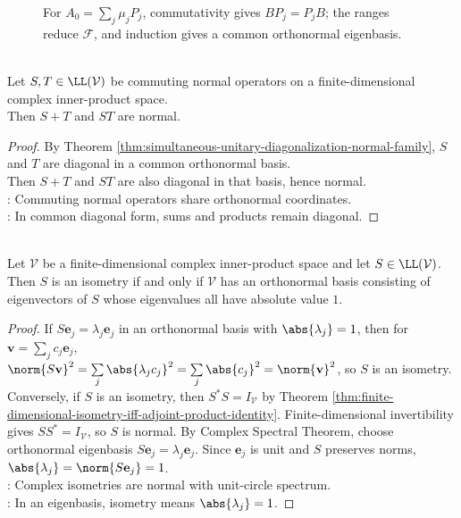 \begin{figure}[H]
  \centering
  
  \caption{For $A_0=\sum_j\mu_jP_j$, commutativity gives $BP_j=P_jB$; the ranges reduce $\mathcal{F}$, and induction gives a common orthonormal eigenbasis.}
  \label{fig:simultaneous-normal-diagonalization}
\end{figure}

\begin{corollary} \label{cor:commuting-normal-sums-products-normal} \\
Let $S,T\in\LL(\mathcal{V})$ be commuting normal operators on a finite-dimensional complex inner-product space.\\
Then $S+T$ and $ST$ are normal.
\begin{proof}
By Theorem \ref{thm:simultaneous-unitary-diagonalization-normal-family}, $S$ and $T$ are diagonal in a common orthonormal basis.\\
Then $S+T$ and $ST$ are also diagonal in that basis, hence normal.\\
: Commuting normal operators share orthonormal coordinates.\\
: In common diagonal form, sums and products remain diagonal.
\end{proof}
\end{corollary}

\begin{theorem} \label{thm:complex-isometry-description} \\
Let $\mathcal{V}$ be a finite-dimensional complex inner-product space and let $S\in\LL(\mathcal{V})$. Then $S$ is an isometry if and only if $\mathcal{V}$ has an orthonormal basis consisting of eigenvectors of $S$ whose eigenvalues all have absolute value $1$.
\begin{proof}
If $S\mathbf{e}_j=\lambda_j\mathbf{e}_j$ in an orthonormal basis with $\abs{\lambda_j}=1$, then for $\mathbf{v}=\sum_j c_j\mathbf{e}_j$,\\
$\norm{S\mathbf{v}}^2=\sum\limits_j\abs{\lambda_jc_j}^2=\sum\limits_j\abs{c_j}^2=\norm{\mathbf{v}}^2$, so $S$ is an isometry. Conversely, if $S$ is an isometry, then $S^*S=I_{\mathcal{V}}$ by Theorem \ref{thm:finite-dimensional-isometry-iff-adjoint-product-identity}. Finite-dimensional invertibility gives $SS^*=I_{\mathcal{V}}$, so $S$ is normal. By Complex Spectral Theorem, choose orthonormal eigenbasis $S\mathbf{e}_j=\lambda_j\mathbf{e}_j$. Since $\mathbf{e}_j$ is unit and $S$ preserves norms, $\abs{\lambda_j}=\norm{S\mathbf{e}_j}=1$.\\
: Complex isometries are normal with unit-circle spectrum.\\
: In an eigenbasis, isometry means $\abs{\lambda_j}=1$.
\end{proof}
\end{theorem}
